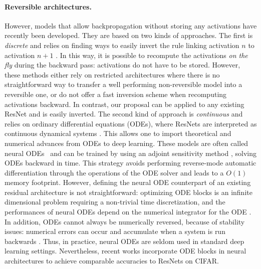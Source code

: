 \documentclass{article}
\begin{document}
\paragraph{Reversible architectures.}
However, models that allow backpropagation without storing any activations have recently been developed. They are based on two kinds of approaches.
The first is \textit{discrete} and relies on finding ways to easily invert the rule linking activation $n$ to activation $n+1$ \citep{gomez2017reversible,chang2017reversible,Haber_2017,jacobsen2018irevnet, behrmann2019invertible}.
In this way, it is possible to recompute the activations \emph{on the fly} during the backward pass: activations do not have to be stored.
However, these methods either rely on restricted architectures where there is no straightforward way to transfer a well performing non-reversible model into a reversible one, or do not offer a fast inversion scheme when recomputing activations backward. In contrast, our proposal can be applied to any existing ResNet and is easily inverted.
The second kind of approach is \textit{continuous} and
relies on ordinary differential equations (ODEs), where ResNets are interpreted as continuous dynamical systems \citep{E_2017,chen2018neural,dupont2019augmented,sun2018stochastic,E_2018,lu2017finite,ruthotto2018deep}. This allows one to import theoretical and numerical advances from ODEs to deep learning.
These models are often called neural ODEs~\citep{chen2018neural} and can be trained by using an adjoint sensitivity method \citep{Pontryagin:234445}, solving ODEs backward in time. This strategy avoids performing reverse-mode automatic differentiation 
through the operations of the ODE solver and leads to a $O (1)$ memory footprint.
However, defining the neural ODE counterpart of an existing residual architecture is not straightforward: optimizing ODE blocks is an infinite dimensional problem requiring a non-trivial time discretization, and the performances of neural ODEs depend on the numerical integrator for the ODE \citep{gusak2020towards}.
In  addition, ODEs cannot always be numerically reversed, because of stability issues: numerical errors can occur and accumulate when a system is run backwards \citep{gholami2019anode, dupont2019augmented}. Thus, in practice, neural ODEs are seldom used in standard deep learning settings.  Nevertheless, recent works \citep{zhang2019anodev2, queiruga2020continuous} incorporate ODE blocks in neural architectures to achieve comparable accuracies to ResNets on CIFAR.
\end{document}
